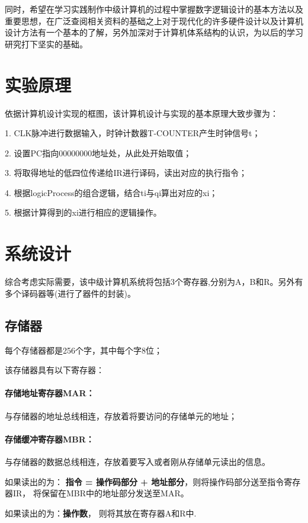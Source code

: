\documentclass[UTF8]{ctexart}
\begin{document}
    同时，希望在学习实践制作中级计算机的过程中掌握数字逻辑设计的基本方法以及重要思想，在广泛查阅相关资料的基础之上对于现代化的许多硬件设计以及计算机设计方法有一个基本的了解，另外加深对于计算机体系结构的认识，为以后的学习研究打下坚实的基础。
    \newpage

    \section{实验原理}
    依据计算机设计实现的框图，该计算机设计与实现的基本原理大致步骤为：

    1. CLK脉冲进行数据输入，时钟计数器T-COUNTER产生时钟信号t；

    2. 设置PC指向00000000地址处，从此处开始取值；

    3. 将取得地址的低四位传递给IR进行译码，读出对应的执行指令；

    4. 根据logicProcess的组合逻辑，结合ti与qi算出对应的xi；

    5. 根据计算得到的xi进行相应的逻辑操作。
    \newpage

    \section{系统设计}
    综合考虑实际需要，该中级计算机系统将包括3个寄存器,分别为A，B和R。另外有多个译码器等(进行了器件的封装)。

    \subsection{存储器}
    每个存储器都是256个字，其中每个字8位；

    该存储器具有以下寄存器：

    \paragraph{存储地址寄存器MAR：} 与存储器的地址总线相连，存放着将要访问的存储单元的地址；

    \paragraph{存储缓冲寄存器MBR：} 与存储器的数据总线相连，存放着要写入或者刚从存储单元读出的信息。

    \qquad    如果读出的为： \textbf{指令 = 操作码部分 + 地址部分}，则将操作码部分送至指令寄存器IR， 将保留在MBR中的地址部分发送至MAR。

    \qquad    如果读出的为：\textbf{操作数}， 则将其放在寄存器A和R中.
\end{document}
